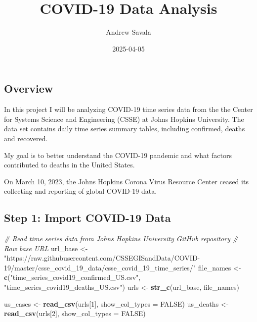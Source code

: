 \documentclass[
]{article}
\title{COVID-19 Data Analysis}
\author{Andrew Savala}
\date{2025-04-05}
\newenvironment{Shaded}{\begin{snugshade}}{\end{snugshade}}
\newcommand{\AttributeTok}[1]{\textcolor[rgb]{0.13,0.29,0.53}{#1}}
\newcommand{\CommentTok}[1]{\textcolor[rgb]{0.56,0.35,0.01}{\textit{#1}}}
\newcommand{\ConstantTok}[1]{\textcolor[rgb]{0.56,0.35,0.01}{#1}}
\newcommand{\DecValTok}[1]{\textcolor[rgb]{0.00,0.00,0.81}{#1}}
\newcommand{\FunctionTok}[1]{\textcolor[rgb]{0.13,0.29,0.53}{\textbf{#1}}}
\newcommand{\NormalTok}[1]{#1}
\newcommand{\OtherTok}[1]{\textcolor[rgb]{0.56,0.35,0.01}{#1}}
\newcommand{\StringTok}[1]{\textcolor[rgb]{0.31,0.60,0.02}{#1}}
\begin{document}
\maketitle

\subsection{Overview}\label{overview}

In this project I will be analyzing COVID-19 time series data from the
the Center for Systems Science and Engineering (CSSE) at Johns Hopkins
University. The data set contains daily time series summary tables,
including confirmed, deaths and recovered.

My goal is to better understand the COVID-19 pandemic and what factors
contributed to deaths in the United States.

On March 10, 2023, the Johns Hopkins Corona Virus Resource Center ceased
its collecting and reporting of global COVID-19 data.

\subsection{Step 1: Import COVID-19
Data}\label{step-1-import-covid-19-data}

\begin{Shaded}
\begin{Highlighting}[]
\CommentTok{\# Read time series data from Johns Hopkins University GitHub repository}
\CommentTok{\# Raw base URL}
\NormalTok{url\_base }\OtherTok{\textless{}{-}} \StringTok{"https://raw.githubusercontent.com/CSSEGISandData/COVID{-}19/master/csse\_covid\_19\_data/csse\_covid\_19\_time\_series/"}
\NormalTok{file\_names }\OtherTok{\textless{}{-}} \FunctionTok{c}\NormalTok{(}\StringTok{"time\_series\_covid19\_confirmed\_US.csv"}\NormalTok{,}
                \StringTok{"time\_series\_covid19\_deaths\_US.csv"}\NormalTok{)}
\NormalTok{urls }\OtherTok{\textless{}{-}} \FunctionTok{str\_c}\NormalTok{(url\_base, file\_names)}

\NormalTok{us\_cases }\OtherTok{\textless{}{-}} \FunctionTok{read\_csv}\NormalTok{(urls[}\DecValTok{1}\NormalTok{], }\AttributeTok{show\_col\_types =} \ConstantTok{FALSE}\NormalTok{)}
\NormalTok{us\_deaths }\OtherTok{\textless{}{-}} \FunctionTok{read\_csv}\NormalTok{(urls[}\DecValTok{2}\NormalTok{], }\AttributeTok{show\_col\_types =} \ConstantTok{FALSE}\NormalTok{)}
\end{Highlighting}
\end{Shaded}
\end{document}
